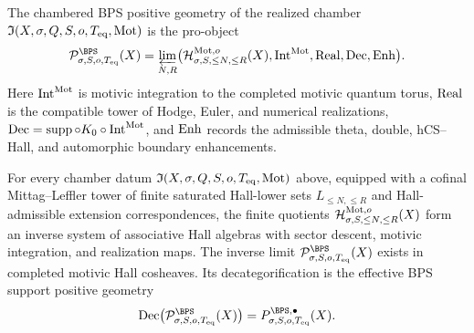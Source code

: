 \begin{definition}
\label{def:bps-positive-geometry}
The chambered BPS positive geometry of the realized chamber
\({\mathfrak I}(X,\sigma,Q,S,o,T_{\mathrm{eq}},\mathrm{Mot})\) is the pro-object
\[
\mathcal P^{\BPS}_{\sigma,S,o,T_{\mathrm{eq}}}(X)
=
\varprojlim_{N,R}
\bigl(
\mathcal H^{\Mot,o}_{\sigma,S,\leq N,\leq R}(X),
\Int^{\Mot},
\Real,
\Dec,
\Enh
\bigr).
\]
Here \(\mathrm{Int}^{\mathrm{Mot}}\) is motivic integration to the completed motivic
quantum torus, \(\mathrm{Real}\) is the compatible tower of Hodge, Euler, and
numerical realizations, \(\mathrm{Dec}=\operatorname{supp}\circ K_0\circ
\mathrm{Int}^{\mathrm{Mot}}\), and \(\mathrm{Enh}\) records the admissible theta, double,
hCS--Hall, and automorphic boundary enhancements.
\end{definition}

\begin{theorem}
\label{thm:bps-positive-finite-first-existence}
For every chamber datum
\({\mathfrak I}(X,\sigma,Q,S,o,T_{\mathrm{eq}},\mathrm{Mot})\) above, equipped
with a cofinal Mittag--Leffler tower of finite saturated Hall-lower
sets \(L_{\leq N,\leq R}\) and Hall-admissible extension
correspondences, the
finite quotients
\(\mathcal H^{\mathrm{Mot},o}_{\sigma,S,\leq N,\leq R}(X)\) form an inverse
system of associative Hall algebras with sector descent, motivic
integration, and realization maps. The inverse limit
\(\mathcal P^{\BPS}_{\sigma,S,o,T_{\mathrm{eq}}}(X)\) exists in
completed motivic Hall cosheaves. Its decategorification is the
effective BPS support positive geometry
\[
\Dec\bigl(\mathcal P^{\BPS}_{\sigma,S,o,T_{\mathrm{eq}}}(X)\bigr)
=
P^{\BPS,\bullet}_{\sigma,S,o,T_{\mathrm{eq}}}(X).
\]
\end{theorem}


